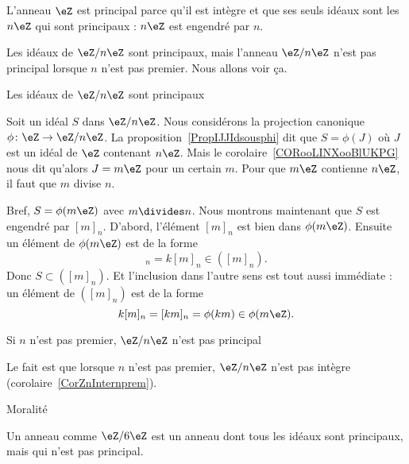 \begin{example}
    L'anneau \( \eZ\) est principal parce qu'il est intègre et que ses seuls idéaux sont les \( n\eZ\) qui sont principaux : \( n\eZ\) est engendré par \( n\).
\end{example}

\begin{example}       \label{EXooCJRPooYkWdyr}

    Les idéaux de \( \eZ/n\eZ\) sont principaux, mais l'anneau \( \eZ/n\eZ\) n'est pas principal lorsque \( n\) n'est pas premier. Nous allons voir ça.

    \begin{subproof}
        \item[Les idéaux de \( \eZ/n\eZ\) sont principaux]

            Soit un idéal \( S\) dans \( \eZ/n\eZ\). Nous considérons la projection canonique \( \phi\colon \eZ\to \eZ/n\eZ\). La proposition~\ref{PropIJJIdsousphi} dit que  \( S=\phi(J)\) où \( J\) est un idéal de \( \eZ\) contenant \( n\eZ\). Mais le corolaire~\ref{CORooLINXooBlUKPG} nous dit qu'alors \( J=m\eZ\) pour un certain \( m\). Pour que \( m\eZ\) contienne \( n\eZ\), il faut que \( m\) divise \( n\).

            Bref, \( S=\phi(m\eZ)\) avec \( m\divides n\). Nous montrons maintenant que \( S\) est engendré par \( [m]_n\). D'abord, l'élément \( [m]_n\) est bien dans \( \phi(m\eZ)\). Ensuite un élément de \( \phi(m\eZ)\) est de la forme
            \begin{equation}
                [km]_n=k[m]_n\in ([m]_n).
            \end{equation}
            Donc \( S\subset ([m]_n)\). Et l'inclusion dans l'autre sens est tout aussi immédiate : un élément de \( ([m]_n)\) est de la forme
            \begin{equation}
                k[m]_n=[km]_n=\phi(km)\in \phi(m\eZ).
            \end{equation}

        \item[Si \( n\) n'est pas premier, \( \eZ/n\eZ\) n'est pas principal]

            Le fait est que lorsque \( n\) n'est pas premier, \( \eZ/n\eZ\) n'est pas intègre (corolaire~\ref{CorZnInternprem}).

        \item[Moralité]

            Un anneau comme \( \eZ/6\eZ\) est un anneau dont tous les idéaux sont principaux, mais qui n'est pas principal.

    \end{subproof}
\end{example}

